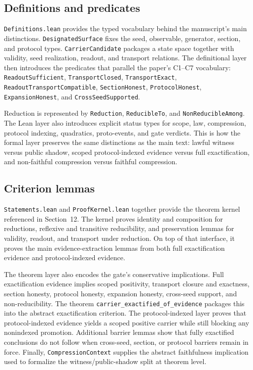 \documentclass[11pt]{article}
\theoremstyle{definition}
\begin{document}
\subsection{Definitions and predicates}

\nolinkurl{Definitions.lean} provides the typed vocabulary behind the manuscript's main
distinctions. \texttt{DesignatedSurface} fixes the seed, observable, generator, section,
and protocol types. \texttt{CarrierCandidate} packages a state space together with
validity, seed realization, readout, and transport relations. The definitional layer then
introduces the predicates that parallel the paper's C1--C7 vocabulary:
\texttt{ReadoutSufficient}, \texttt{TransportClosed}, \texttt{TransportExact},
\texttt{ReadoutTransportCompatible}, \texttt{SectionHonest},
\texttt{ProtocolHonest}, \texttt{ExpansionHonest}, and \texttt{CrossSeedSupported}.

Reduction is represented by \texttt{Reduction}, \texttt{ReducibleTo}, and
\texttt{NonReducibleAmong}. The Lean layer also introduces explicit status types for scope,
law, compression, protocol indexing, quadratics, proto-events, and gate verdicts. This is
how the formal layer preserves the same distinctions as the main text: lawful witness
versus public shadow, scoped protocol-indexed evidence versus full exactification, and
non-faithful compression versus faithful compression.

\subsection{Criterion lemmas}

\nolinkurl{Statements.lean} and \nolinkurl{ProofKernel.lean} together provide the theorem
kernel referenced in Section~12. The kernel proves identity and composition for reductions,
reflexive and transitive reducibility, and preservation lemmas for validity, readout, and
transport under reduction. On top of that interface, it proves the main evidence-extraction
lemmas from both full exactification evidence and protocol-indexed evidence.

The theorem layer also encodes the gate's conservative implications. Full exactification
evidence implies scoped positivity, transport closure and exactness, section honesty,
protocol honesty, expansion honesty, cross-seed support, and non-reducibility. The theorem
\texttt{carrier\_exactified\_of\_evidence} packages this into the abstract exactification
criterion. The protocol-indexed layer proves that protocol-indexed evidence yields a scoped
positive carrier while still blocking any nonindexed promotion. Additional barrier lemmas
show that fully exactified conclusions do not follow when cross-seed, section, or protocol
barriers remain in force. Finally, \texttt{CompressionContext} supplies the abstract
faithfulness implication used to formalize the witness/public-shadow split at theorem level.
\end{document}
